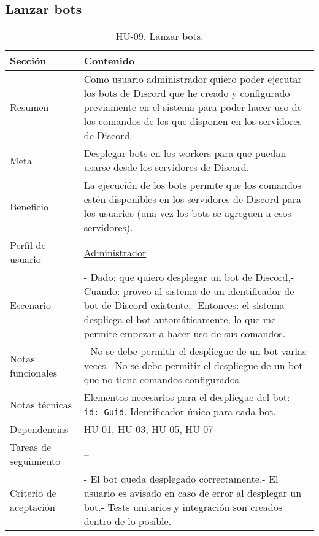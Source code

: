 \subsection{Lanzar bots}

\begin{table}[H]
    \centering
    \def\arraystretch{1.25}
    \begin{adjustbox}{max width=\textwidth}
    \begin{tabularx}{\textwidth}{l|L}
    \hline
        \textbf{Sección} & \textbf{Contenido} \\ \hline
    \hline
        Resumen & Como usuario administrador quiero poder ejecutar los bots de Discord que he creado y configurado previamente en el sistema para poder hacer uso de los comandos de los que disponen en los servidores de Discord. \\ \hline
        Meta & Desplegar bots en los workers para que puedan usarse desde los servidores de Discord. \\ \hline
        Beneficio & La ejecución de los bots permite que los comandos estén disponibles en los servidores de Discord para los usuarios (una vez los bots se agreguen a esos servidores). \\ \hline
        Perfil de usuario & \hyperref[sec:personaAdmin]{Administrador} \\ \hline
        Escenario & - Dado: que quiero desplegar un bot de Discord,\linebreak - Cuando: proveo al sistema de un identificador de bot de Discord existente,\linebreak - Entonces: el sistema despliega el bot automáticamente, lo que me permite empezar a hacer uso de sus comandos. \\ \hline
        Notas funcionales & - No se debe permitir el despliegue de un bot varias veces.\linebreak - No se debe permitir el despliegue de un bot que no tiene comandos configurados. \\ \hline
        Notas técnicas & Elementos necesarios para el despliegue del bot:\linebreak - \verb|id: Guid|. Identificador único para cada bot. \\ \hline
        Dependencias & HU-01, HU-03, HU-05, HU-07 \\ \hline
        Tareas de seguimiento & – \\ \hline
        Criterio de aceptación & - El bot queda desplegado correctamente.\linebreak - El usuario es avisado en caso de error al desplegar un bot.\linebreak - Tests unitarios y integración son creados dentro de lo posible. \\ \hline
    \end{tabularx}
    \end{adjustbox}
    \caption{HU-09. Lanzar bots.}
\end{table}

